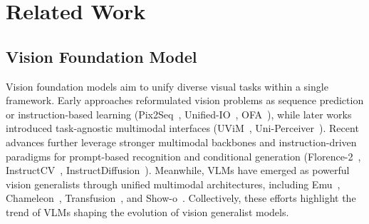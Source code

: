 \section{Related Work}
\label{sec:relat}

\subsection{Vision Foundation Model}


\noindent Vision foundation models aim to unify diverse visual tasks within a single framework. Early approaches reformulated vision problems as sequence prediction or instruction-based learning (Pix2Seq~\cite{chen2022unified}, Unified-IO~\cite{lu2022unifiedio}, OFA~\cite{wang2022ofa}), while later works introduced task-agnostic multimodal interfaces (UViM~\cite{zhang2022uvim}, Uni-Perceiver~\cite{zhu2022uniperceiver}). Recent advances further leverage stronger multimodal backbones and instruction-driven paradigms for prompt-based recognition and conditional generation (Florence-2~\cite{xiao2023florence2}, InstructCV~\cite{gan2023instructcv}, InstructDiffusion~\cite{geng2023instructdiffusion}). Meanwhile, VLMs have emerged as powerful vision generalists through unified multimodal architectures, including Emu~\cite{sun2023emu,wang2024emu3}, Chameleon~\cite{chameleon2024}, Transfusion~\cite{transfusion2024}, and Show-o~\cite{showo2024}. Collectively, these efforts highlight the trend of VLMs shaping the evolution of vision generalist models.


